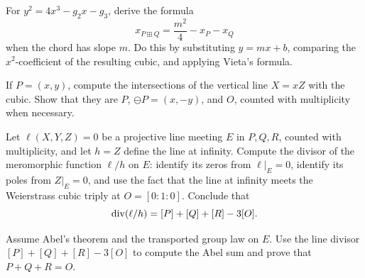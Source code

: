 \begin{exercise}
For \(y^2=4x^3-g_2x-g_3\), derive the formula
\[
  x_{P\boxplus Q}=\frac{m^2}{4}-x_P-x_Q
\]
when the chord has slope \(m\).
Do this by substituting \(y=mx+b\), comparing the \(x^2\)-coefficient of the
resulting cubic, and applying Vieta's formula.
\end{exercise}

\begin{exercise}
If \(P=(x,y)\), compute the intersections of the vertical line \(X=xZ\) with
the cubic.  Show that they are \(P\), \(\ominus P=(x,-y)\), and \(O\), counted
with multiplicity when necessary.
\end{exercise}

\begin{exercise}
Let \(\ell(X,Y,Z)=0\) be a projective line meeting \(E\) in \(P,Q,R\), counted
with multiplicity, and let \(h=Z\) define the line at infinity.  Compute the
divisor of the meromorphic function \(\ell/h\) on \(E\): identify its zeros from
\(\ell|_E=0\), identify its poles from \(Z|_E=0\), and use the fact that the
line at infinity meets the Weierstrass cubic triply at \(O=[0:1:0]\).  Conclude
that
\[
  \operatorname{div}(\ell/h)=[P]+[Q]+[R]-3[O].
\]
\end{exercise}

\begin{exercise}
Assume Abel's theorem and the transported group law on \(E\).  Use the line
divisor \([P]+[Q]+[R]-3[O]\) to compute the Abel sum and prove that
\(P+Q+R=O\).
\end{exercise}
